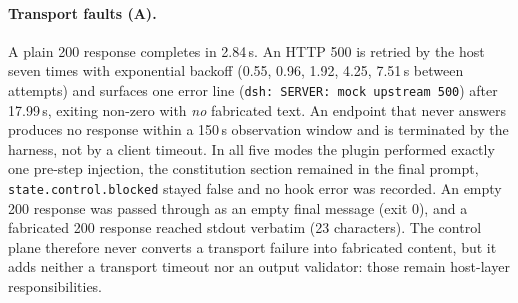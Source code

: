 \paragraph{Transport faults (A).} A plain 200 response completes in 2.84\,s. An
HTTP 500 is retried by the host seven times with exponential backoff
(0.55, 0.96, 1.92, 4.25, 7.51\,s between attempts) and surfaces one error line
(\texttt{dsh:\allowbreak{} SERVER:\allowbreak{} mock upstream 500}) after 17.99\,s, exiting non-zero with
\emph{no} fabricated text. An endpoint that never answers produces no response
within a 150\,s observation window and is terminated by the harness, not by a
client timeout. In all five modes the plugin performed exactly one pre-step
injection, the constitution section remained in the final prompt,
\texttt{state.\allowbreak{}control.\allowbreak{}blocked} stayed false and no hook error was recorded. An
empty 200 response was passed through as an empty final message (exit 0), and a
fabricated 200 response reached stdout verbatim (23 characters). The control plane
therefore never converts a transport failure into fabricated content, but it adds
neither a transport timeout nor an output validator: those remain host-layer
responsibilities.

